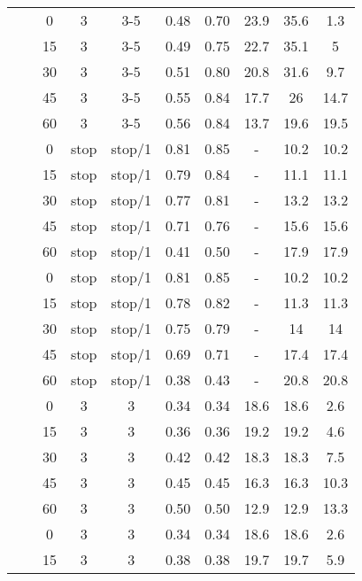 \begin{longtable}[t]{cccccccccc}
\nopagebreak
&  & 0 & 3 & 3-5 & 0.48 & 0.70 & 23.9 & 35.6 & 1.3\\
\nopagebreak
&  & 15 & 3 & 3-5 & 0.49 & 0.75 & 22.7 & 35.1 & 5\\
\nopagebreak
&  & 30 & 3 & 3-5 & 0.51 & 0.80 & 20.8 & 31.6 & 9.7\\
\nopagebreak
&  & 45 & 3 & 3-5 & 0.55 & 0.84 & 17.7 & 26 & 14.7\\
\nopagebreak
\multirow{-10}{*}{\centering\arraybackslash 7} & \multirow{-5}{*}{\centering\arraybackslash 0.33} & 60 & 3 & 3-5 & 0.56 & 0.84 & 13.7 & 19.6 & 19.5\\
\cmidrule{1-10}\pagebreak[0]
&  & 0 & stop & stop/1 & 0.81 & 0.85 & - & 10.2 & 10.2\\
\nopagebreak
&  & 15 & stop & stop/1 & 0.79 & 0.84 & - & 11.1 & 11.1\\
\nopagebreak
&  & 30 & stop & stop/1 & 0.77 & 0.81 & - & 13.2 & 13.2\\
\nopagebreak
&  & 45 & stop & stop/1 & 0.71 & 0.76 & - & 15.6 & 15.6\\
\nopagebreak
& \multirow{-5}{*}{\centering\arraybackslash 0.2} & 60 & stop & stop/1 & 0.41 & 0.50 & - & 17.9 & 17.9\\
\nopagebreak
&  & 0 & stop & stop/1 & 0.81 & 0.85 & - & 10.2 & 10.2\\
\nopagebreak
&  & 15 & stop & stop/1 & 0.78 & 0.82 & - & 11.3 & 11.3\\
\nopagebreak
&  & 30 & stop & stop/1 & 0.75 & 0.79 & - & 14 & 14\\
\nopagebreak
&  & 45 & stop & stop/1 & 0.69 & 0.71 & - & 17.4 & 17.4\\
\nopagebreak
\multirow{-10}{*}{\centering\arraybackslash 8} & \multirow{-5}{*}{\centering\arraybackslash 0.33} & 60 & stop & stop/1 & 0.38 & 0.43 & - & 20.8 & 20.8\\
\cmidrule{1-10}\pagebreak[0]
&  & 0 & 3 & 3 & 0.34 & 0.34 & 18.6 & 18.6 & 2.6\\
\nopagebreak
&  & 15 & 3 & 3 & 0.36 & 0.36 & 19.2 & 19.2 & 4.6\\
\nopagebreak
&  & 30 & 3 & 3 & 0.42 & 0.42 & 18.3 & 18.3 & 7.5\\
\nopagebreak
&  & 45 & 3 & 3 & 0.45 & 0.45 & 16.3 & 16.3 & 10.3\\
\nopagebreak
& \multirow{-5}{*}{\centering\arraybackslash 0.2} & 60 & 3 & 3 & 0.50 & 0.50 & 12.9 & 12.9 & 13.3\\
\nopagebreak
&  & 0 & 3 & 3 & 0.34 & 0.34 & 18.6 & 18.6 & 2.6\\
\nopagebreak
&  & 15 & 3 & 3 & 0.38 & 0.38 & 19.7 & 19.7 & 5.9\\

\end{longtable}
